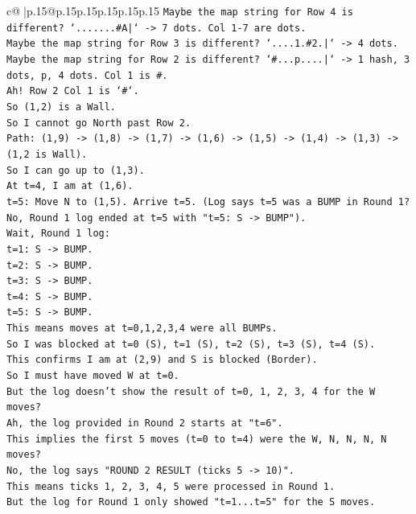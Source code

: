 \documentclass{article}
\begin{document}
{\begin{supertabular}{c@{$\;$}|p{.15\linewidth}@{}p{.15\linewidth}p{.15\linewidth}p{.15\linewidth}p{.15\linewidth}p{.15\linewidth}}
{{{\texttt{Maybe the map string for Row 4 is different? `.......\#A|` {-}> 7 dots. Col 1{-}7 are dots.} \\
\texttt{Maybe the map string for Row 3 is different? `....1.\#2.|` {-}> 4 dots.} \\
\texttt{Maybe the map string for Row 2 is different? `\#...p....|` {-}> 1 hash, 3 dots, p, 4 dots. Col 1 is \#.} \\
\texttt{Ah! Row 2 Col 1 is `\#`.} \\
\texttt{So (1,2) is a Wall.} \\
\texttt{So I cannot go North past Row 2.} \\
\texttt{Path: (1,9) {-}> (1,8) {-}> (1,7) {-}> (1,6) {-}> (1,5) {-}> (1,4) {-}> (1,3) {-}> (1,2 is Wall).} \\
\texttt{So I can go up to (1,3).} \\
\texttt{At t=4, I am at (1,6).} \\
\texttt{t=5: Move N to (1,5). Arrive t=5. (Log says t=5 was a BUMP in Round 1? No, Round 1 log ended at t=5 with "t=5: S {-}> BUMP").} \\
\texttt{Wait, Round 1 log:} \\
\texttt{t=1: S {-}> BUMP.} \\
\texttt{t=2: S {-}> BUMP.} \\
\texttt{t=3: S {-}> BUMP.} \\
\texttt{t=4: S {-}> BUMP.} \\
\texttt{t=5: S {-}> BUMP.} \\
\texttt{This means moves at t=0,1,2,3,4 were all BUMPs.} \\
\texttt{So I was blocked at t=0 (S), t=1 (S), t=2 (S), t=3 (S), t=4 (S).} \\
\texttt{This confirms I am at (2,9) and S is blocked (Border).} \\
\texttt{So I must have moved W at t=0.} \\
\texttt{But the log doesn't show the result of t=0, 1, 2, 3, 4 for the W moves?} \\
\texttt{Ah, the log provided in Round 2 starts at "t=6".} \\
\texttt{This implies the first 5 moves (t=0 to t=4) were the W, N, N, N, N moves?} \\
\texttt{No, the log says "ROUND 2 RESULT (ticks 5 {-}> 10)".} \\
\texttt{This means ticks 1, 2, 3, 4, 5 were processed in Round 1.} \\
\texttt{But the log for Round 1 only showed "t=1...t=5" for the S moves.} \\
}}}
\end{supertabular}}
\end{document}
